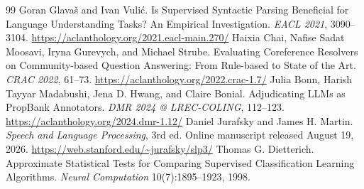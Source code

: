 \documentclass[11pt,letterpaper]{article}
\begin{document}
\begin{thebibliography}{99}
 Goran Glava\v{s} and Ivan Vuli\'c. Is Supervised Syntactic Parsing Beneficial for Language Understanding Tasks? An Empirical Investigation. \emph{EACL 2021}, 3090--3104. \url{https://aclanthology.org/2021.eacl-main.270/}
 Haixia Chai, Nafise Sadat Moosavi, Iryna Gurevych, and Michael Strube. Evaluating Coreference Resolvers on Community-based Question Answering: From Rule-based to State of the Art. \emph{CRAC 2022}, 61--73. \url{https://aclanthology.org/2022.crac-1.7/}
 Julia Bonn, Harish Tayyar Madabushi, Jena D. Hwang, and Claire Bonial. Adjudicating LLMs as PropBank Annotators. \emph{DMR 2024 @ LREC-COLING}, 112--123. \url{https://aclanthology.org/2024.dmr-1.12/}
 Daniel Jurafsky and James H. Martin. \emph{Speech and Language Processing}, 3rd ed. Online manuscript released August 19, 2026. \url{https://web.stanford.edu/~jurafsky/slp3/}
 Thomas G. Dietterich. Approximate Statistical Tests for Comparing Supervised Classification Learning Algorithms. \emph{Neural Computation} 10(7):1895--1923, 1998.
\end{thebibliography}
\end{document}
